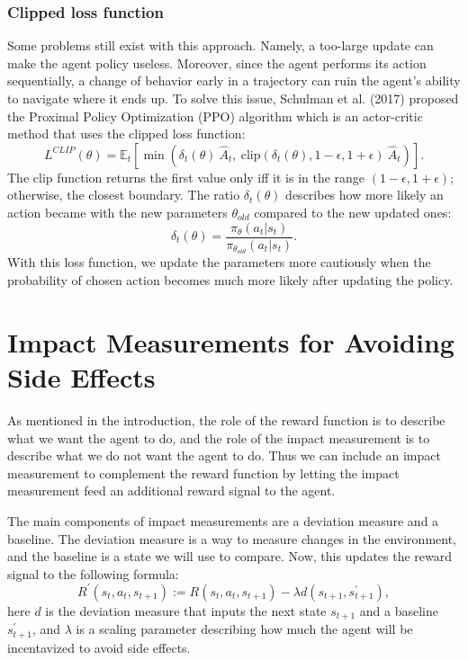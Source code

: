 \documentclass[12pt,A4]{report}
\theoremstyle{definition}
\begin{document}
\subsubsection{Clipped loss function}
Some problems still exist with this approach. Namely, a too-large update can make the agent policy useless. Moreover, since the agent performs its action sequentially, a change of behavior early in a trajectory can ruin the agent's ability to navigate where it ends up. To solve this issue, Schulman et al. (2017) proposed the Proximal Policy Optimization (PPO) algorithm which is an actor-critic method that uses the clipped loss function:
\[L^{CLIP}(\theta) = \mathbb{E}_t \left [ \min(\delta_t(\theta) \ \hat{A}_t,\ 
\text{clip}(\delta_t(\theta), 1 - \epsilon, 1 + \epsilon) \ \hat{A}_t) \right ]. \]
The clip function returns the first value only iff it is in the range $(1-\epsilon, 1+\epsilon)$; otherwise, the closest boundary. The ratio $\delta_t(\theta)$ describes how more likely an action became with the new parameters $\theta_{old}$ compared to the new updated ones:
\[ \delta_t(\theta) = \frac{\pi_\theta(a_t| s_t)}{\pi_{\theta_{old}}(a_t|s_t)}. \]
With this loss function, we update the parameters more cautiously when the probability of chosen action becomes much more likely after updating the policy.


\section{Impact Measurements for Avoiding Side Effects}

As mentioned in the introduction, the role of the reward function is to describe what we want the agent to do, and the role of the impact measurement is to describe what we do not want the agent to do. Thus we can include an impact measurement to complement the reward function by letting the impact measurement feed an additional reward signal to the agent.

The main components of impact measurements are a deviation measure and a baseline. The deviation measure is a way to measure changes in the environment, and the baseline is a state we will use to compare. Now, this updates the reward signal to the following formula:
\[ R^\prime(s_t, a_t, s_{t+1}) := R(s_t, a_t, s_{t+1}) - \lambda d(s_{t+1
}, s_{t+1}^\prime), \]
here $d$ is the deviation measure that inputs the next state $s_{t+1}$ and a baseline $s_{t+1}^\prime$, and $\lambda$ is a scaling parameter describing how much the agent will be incentavized to avoid side effects.
\end{document}
